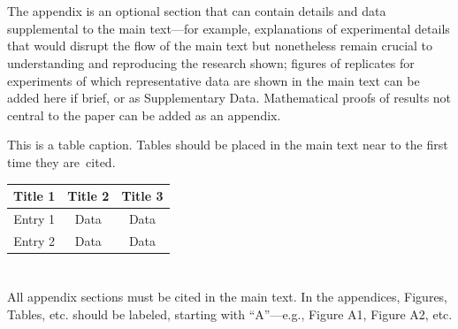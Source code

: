 \documentclass[journal,article,submit,moreauthors,pdftex]{Definitions/mdpi}
\begin{document}
\begin{paracol}{2}
\section{}
\subsection{}
The appendix is an optional section that can contain details and data supplemental to the main text---for example, explanations of experimental details that would disrupt the flow of the main text but nonetheless remain crucial to understanding and reproducing the research shown; figures of replicates for experiments of which representative data are shown in the main text can be added here if brief, or as Supplementary Data. Mathematical proofs of results not central to the paper can be added as an appendix.

\begin{specialtable}[H] 
\caption{This is a table caption. Tables should be placed in the main text near to the first time they are~cited.\label{tab2}}
\begin{tabular}{ccc}
\toprule
\textbf{Title 1}	& \textbf{Title 2}	& \textbf{Title 3}\\
\midrule
Entry 1		& Data			& Data\\
Entry 2		& Data			& Data\\
\bottomrule
\end{tabular}
\end{specialtable}

\section{}
All appendix sections must be cited in the main text. In the appendices, Figures, Tables, etc. should be labeled, starting with ``A''---e.g., Figure A1, Figure A2, etc. 

\end{paracol}

\end{document}
